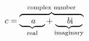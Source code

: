 \documentclass[12pt]{article}
\begin{document}
${ \displaystyle
 c = \overbrace
     { \underbrace{\thickspace\thickspace\thickspace\thickspace\thickspace a \thickspace\thickspace\thickspace\thickspace}_\text{real}
       +
       \underbrace{\thickspace\thickspace\thickspace\thickspace\thickspace b\mathrm{i} \thickspace\thickspace\thickspace\thickspace}_\text{imaginary}
     }^\text{complex number}
}$
\end{document}

